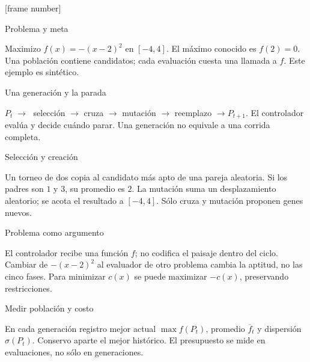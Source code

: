 


[frame number]

\date{}




\begin{frame}{Problema y meta}

Maximizo $f(x)=-(x-2)^2$ en $[-4,4]$. El máximo conocido es $f(2)=0$. Una población contiene candidatos; cada evaluación cuesta una llamada a $f$. Este ejemplo es sintético.

\end{frame}

\begin{frame}{Una generación y la parada}

$P_t\;\longrightarrow\;$ selección $\longrightarrow$ cruza $\longrightarrow$ mutación $\longrightarrow$ reemplazo $\longrightarrow P_{t+1}$. El controlador evalúa y decide cuándo parar. Una generación no equivale a una corrida completa.

\end{frame}

\begin{frame}{Selección y creación}

Un torneo de dos copia al candidato más apto de una pareja aleatoria. Si los padres son $1$ y $3$, su promedio es $2$. La mutación suma un desplazamiento aleatorio; se acota el resultado a $[-4,4]$. Sólo cruza y mutación proponen genes nuevos.

\end{frame}

\begin{frame}{Problema como argumento}

El controlador recibe una función $f$; no codifica el paisaje dentro del ciclo. Cambiar de $-(x-2)^2$ al evaluador de otro problema cambia la aptitud, no las cinco fases. Para minimizar $c(x)$ se puede maximizar $-c(x)$, preservando restricciones.

\end{frame}

\begin{frame}{Medir población y costo}

En cada generación registro mejor actual $\max f(P_t)$, promedio $\overline f_t$ y dispersión $\sigma(P_t)$. Conservo aparte el mejor histórico. El presupuesto se mide en evaluaciones, no sólo en generaciones.

\end{frame}

